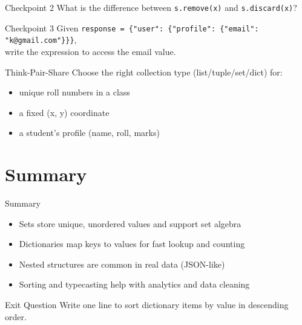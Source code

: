 \documentclass{beamer}
\begin{document}
\begin{frame}[fragile]{Checkpoint 2}
  What is the difference between \texttt{s.remove(x)} and \texttt{s.discard(x)}?
\end{frame}

\begin{frame}[fragile]{Checkpoint 3}
  Given \texttt{response = \{"user": \{"profile": \{"email": "k@gmail.com"\}\}\}},\\
  write the expression to access the email value.
\end{frame}

\begin{frame}[fragile]{Think-Pair-Share}
  Choose the right collection type (list/tuple/set/dict) for:
  \begin{itemize}[<+->]
    \item unique roll numbers in a class
    \item a fixed (x, y) coordinate
    \item a student's profile (name, roll, marks)
  \end{itemize}
\end{frame}

\section{Summary}
\label{sec:summary}

\begin{frame}[fragile]{Summary}
  \begin{itemize}[<+->]
    \item Sets store unique, unordered values and support set algebra
    \item Dictionaries map keys to values for fast lookup and counting
    \item Nested structures are common in real data (JSON-like)
    \item Sorting and typecasting help with analytics and data cleaning
  \end{itemize}
\end{frame}

\begin{frame}[fragile]{Exit Question}
  Write one line to sort dictionary items by value in descending order.
\end{frame}
\end{document}
